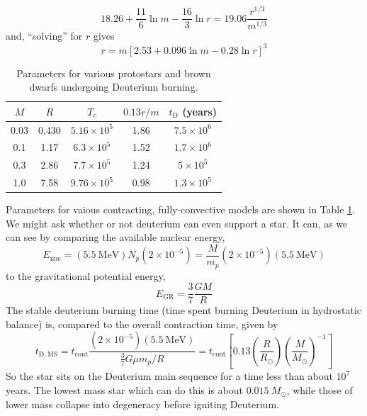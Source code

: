 \documentclass[10pt]{article}
\numberwithin{equation}{section}
\newcommand{\n}{\noindent}
\begin{document}
  \begin{equation}
    \label{eq:393}
    18.26 +\frac{11}{6}\ln m-\frac{16}{3}\ln r=19.06\frac{r^{1/3}}{m^{1/3}}
  \end{equation}
  and, ``solving'' for $r$ gives
  \begin{equation}
    \label{eq:394}
    r=m\left[2.53+0.096\ln m-0.28 \ln r\right]^3
  \end{equation}
  \begin{table}[htb]
    \centering
    \begin{tabular}{ccccc}
      $M$ & $R$ & $T_c$ & $0.13 r/m$ & $t_\mathrm{D}$ (years)\\
      \hline \hline
      0.03 & 0.430 & $5.16\times 10^{5}$ & 1.86 & $7.5\times 10^6$\\
      0.1 & 1.17 & $6.3\times 10^5$ & 1.52 & $1.7\times 10^6$\\
      0.3 & 2.86 & $7.7\times 10^5$ & 1.24 & $5\times 10^5$\\
      1.0 & 7.58 & $9.76\times 10^5$ & 0.98 & $1.3\times 10^5$
    \end{tabular}
    \caption{Parameters for various protostars and brown dwarfs undergoing Deuterium burning.}
    \label{tab:deuterium}
  \end{table}
  Parameters for vaious contracting, fully-convective models are shown
  in Table \ref{tab:deuterium}.\\

  \n We might ask whether or not deuterium can even support a star. It
  can, as we can see by comparing the available nuclear energy,
  \begin{equation}
    \label{eq:395}
    E_{\mathrm{nuc}}=(5.5\ \mathrm{MeV})N_p(2\times
    10^{-5})=\frac{M}{m_p}\left(2\times 10^{-5}\right)\left(5.5\ \mathrm{MeV}\right)
  \end{equation}
  to the gravitational potential energy,
  \begin{equation}
    \label{eq:396}
    E_{\mathrm{GR}}=\frac{3}{7}\frac{GM}{R}
  \end{equation}
  The stable deuterium burning time (time spent burning Deuterium in
  hydrostatic balance) is, compared to the overall contraction time,
  given by
  \begin{equation}
    \label{eq:397}
    t_{\mathrm{D, MS}}=t_{\mathrm{cont}}\frac{(2\times 10^{-5})(5.5\
      \mathrm{MeV})}{\frac{3}{7}G\mu m_p/R}=t_{\mathrm{cont}}\left[0.13\left(\frac{R}{R_\odot}\right)\left(\frac{M}{M_\odot}\right)^{-1}\right]
  \end{equation}
  So the star sits on the Deuterium main sequence for a time less than
  about $10^7$ years. The lowest mass star which can do this is about
  $0.015\ M_\odot$, while those of lower mass collapse into degeneracy before
  igniting Deuterium.\\
\end{document}
